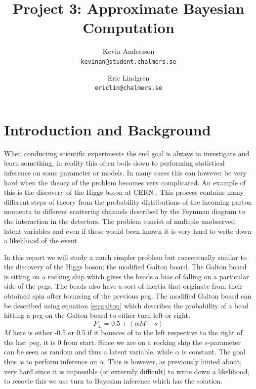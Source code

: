 \documentclass[11pt,a4paper]{article}
\title{Project 3: Approximate Bayesian Computation}
\author{
  Kevin Andersson\\
  \texttt{kevinan@student.chalmers.se}
  \and
   Eric Lindgren\\
  \texttt{ericlin@chalmers.se}
}
\begin{document}
\maketitle

{}%
\setcounter{page}{1}
\section{Introduction and Background}

When conducting scientific experiments the end goal is always to investigate and learn something, in reality this often boils down to performing statistical inference on some parameter or models. In many cases this can however be very hard when the theory of the problem becomes very complicated. An example of this is the discovery of the Higgs boson at CERN \cite{lec13}. This process contains many different steps of theory from the probability distributions of the incoming parton momenta to different scattering channels described by the Feynman diagram to the interaction in the detectors. The problem consist of multiple unobserved latent variables and even if these would been known it is very hard to write down a likelihood of the event.

In this report we will study a much simpler problem but conceptually similar to the discovery of the Higgs boson; the modified Galton board. The Galton board is sitting on a rocking ship which gives the beads a bias of falling on a particular side of the pegs. The beads also have a sort of inertia that originate from their obtained spin after bouncing of the previous peg. The modified Galton board can be described using equation \ref{eq:galton} which describes the probability of a bead hitting a peg on the Galton board to either turn left or right. 
\begin{equation}
    \label{eq:galton}
    P_{\pm} = 0.5 \pm \left(\alpha M + s \right)
\end{equation}
$M$ here is either -0.5 or 0.5 if it bounces of to the left respective to the right of the last peg, it is  0 from start.  Since we are on a rocking ship the $s$-parameter can be seen as random and thus a latent variable, while $\alpha$ is constant. The goal thus is to perform inference on $\alpha$. This is however, as previously hinted about, very hard since it is impossible (or extermly difficult) to write down a likelihood, to resovle this we use turn to Bayesian inference which has the solution.
\end{document}
